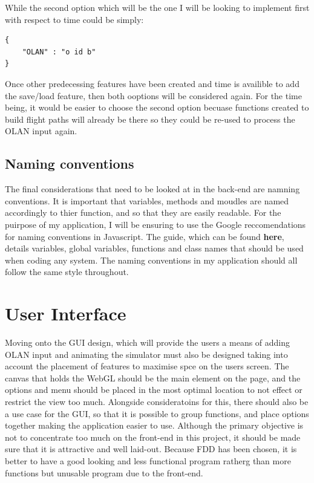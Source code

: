 While the second option which will be the one I will be looking to implement first with respect to time could be simply:

\lstset{language=JavaScript}
\medskip
\begin{lstlisting}[caption=A JSON means of holding break downs of manouvres with each one holding information on different varients of the move such as inverse and reverse and description of the OLAN notation]
{
	"OLAN" : "o id b"
}
\end{lstlisting}
\label{listing:json}

Once other predecessing features have been created and time is availible to add the save/load feature, then both ooptions will be considered again. For the time being, it would be easier to choose the second option becuase functions created to build flight paths will already be there so they could be re-used to process the OLAN input again.

\subsection{Naming conventions}
The final considerations that need to be looked at in the back-end are namning conventions. It is important that variables, methods and moudles are named accordingly to thier function, and so that they are easily readable. For the puirpose of my application, I will be ensuring to use the Google reccomendations for naming conventions in Javascript. The guide, which can be found \textbf{here}, details variables, global variables, functions and class names that should be used when coding any system. The naming conventions in my application should all follow the same style throughout.

\section{User Interface}
Moving onto the GUI design, which will provide the users a means of adding OLAN input and animating the simulator must also be designed taking into account the placement of features to maximise spce on the users screen. The canvas that holds the WebGL should be the main element on the page, and the options and menu should be placed in the most optimal location to not effect or restrict the view too much. Alongside consideratoins for this, there should also be a use case for the GUI, so that it is possible to group functions, and place options together making the application easier to use. Although the primary objective is not to concentrate too much on the front-end in this project, it should be made sure that it is attractive and well laid-out. Because FDD has been chosen, it is better to have a good looking and less functional program ratherg than more functions but unusable program due to the front-end.

